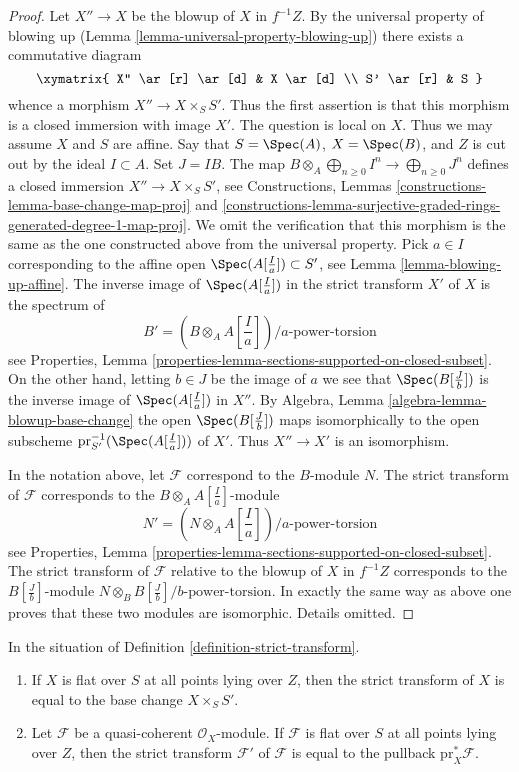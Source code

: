 \begin{proof}
Let $X'' \to X$ be the blowup of $X$ in $f^{-1}Z$. By the universal
property of blowing up (Lemma \ref{lemma-universal-property-blowing-up})
there exists a commutative diagram
$$
\xymatrix{
X'' \ar[r] \ar[d] & X \ar[d] \\
S' \ar[r] & S
}
$$
whence a morphism $X'' \to X \times_S S'$. Thus the first assertion
is that this morphism is a closed immersion with image $X'$.
The question is local on $X$. Thus we may assume $X$
and $S$ are affine. Say that $S = \Spec(A)$, $X = \Spec(B)$, and $Z$
is cut out by the ideal $I \subset A$. Set $J = IB$. The map
$B \otimes_A \bigoplus_{n \geq 0} I^n \to \bigoplus_{n \geq 0} J^n$
defines a closed immersion $X'' \to X \times_S S'$, see
Constructions, Lemmas
\ref{constructions-lemma-base-change-map-proj} and
\ref{constructions-lemma-surjective-graded-rings-generated-degree-1-map-proj}.
We omit the verification that this morphism is the same as the
one constructed above from the universal property.
Pick $a \in I$ corresponding to the affine open
$\Spec(A[\frac{I}{a}]) \subset S'$, see Lemma \ref{lemma-blowing-up-affine}.
The inverse image of $\Spec(A[\frac{I}{a}])$ in the strict transform
$X'$ of $X$ is the spectrum of
$$
B' = (B \otimes_A A[\textstyle{\frac{I}{a}}])/a\text{-power-torsion}
$$
see Properties, Lemma
\ref{properties-lemma-sections-supported-on-closed-subset}.
On the other hand, letting $b \in J$ be the image of $a$ we see that
$\Spec(B[\frac{J}{b}])$ is the inverse image of $\Spec(A[\frac{I}{a}])$
in $X''$. By Algebra, Lemma \ref{algebra-lemma-blowup-base-change}
the open $\Spec(B[\frac{J}{b}])$ maps isomorphically to the open subscheme
$\text{pr}_{S'}^{-1}(\Spec(A[\frac{I}{a}]))$ of $X'$.
Thus $X'' \to X'$ is an isomorphism.

\medskip\noindent
In the notation above, let $\mathcal{F}$ correspond to the $B$-module $N$.
The strict transform of $\mathcal{F}$ corresponds to the
$B \otimes_A A[\frac{I}{a}]$-module
$$
N' = (N \otimes_A A[\textstyle{\frac{I}{a}}])/a\text{-power-torsion}
$$
see Properties, Lemma
\ref{properties-lemma-sections-supported-on-closed-subset}.
The strict transform of $\mathcal{F}$ relative to the blowup of
$X$ in $f^{-1}Z$ corresponds to the $B[\frac{J}{b}]$-module
$N \otimes_B B[\frac{J}{b}]/b\text{-power-torsion}$. In exactly the same
way as above one proves that these two modules are isomorphic.
Details omitted.
\end{proof}

\begin{lemma}
\label{lemma-strict-transform-flat}
In the situation of Definition \ref{definition-strict-transform}.
\begin{enumerate}
\item If $X$ is flat over $S$ at all points lying over $Z$, then
the strict transform of $X$ is equal to the base change $X \times_S S'$.
\item Let $\mathcal{F}$ be a quasi-coherent $\mathcal{O}_X$-module.
If $\mathcal{F}$ is flat over $S$ at all points lying over $Z$, then
the strict transform $\mathcal{F}'$ of $\mathcal{F}$ is equal to the
pullback $\text{pr}_X^*\mathcal{F}$.
\end{enumerate}
\end{lemma}

